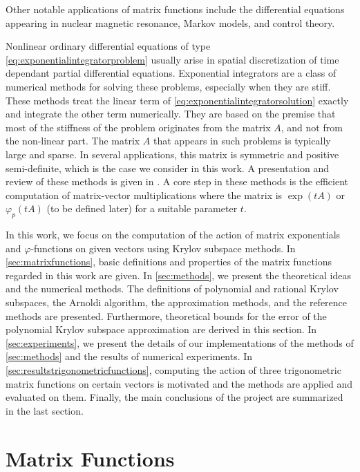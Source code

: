 Other notable applications of matrix functions include the differential equations
appearing in nuclear magnetic resonance, Markov models, and control theory.

Nonlinear ordinary differential equations of type \eqref{eq:exponentialintegratorproblem}
usually arise in spatial discretization of time dependant partial differential equations.
Exponential integrators are a class of numerical methods for solving these problems, especially
when they are stiff. These methods treat the linear term of \eqref{eq:exponentialintegratorsolution}
exactly and integrate the other term numerically. They are based on the premise that most of the
stiffness of the problem originates from the matrix $A$, and not from the non-linear part. The matrix
$A$ that appears in such problems is typically large and sparse. In several applications, this matrix
is symmetric and positive semi-definite, which is the case we consider in this work.
A presentation and review of these methods is given in \cite{minchev2005review}.
A core step in these methods is the efficient computation of matrix-vector multiplications where
the matrix is $\exp(tA)$ or $\varphi_p(tA)$ (to be defined later) for a suitable parameter $t$.

In this work, we focus on the computation of the action of matrix exponentials and
$\varphi$-functions on given vectors using Krylov subspace methods.
In \autoref{sec:matrixfunctions}, basic definitions and properties of the matrix functions
regarded in this work are given. In \autoref{sec:methods}, we present the theoretical ideas
and the numerical methods. The definitions of polynomial and rational Krylov subspaces,
the Arnoldi algorithm, the approximation methods, and the reference methods are presented.
Furthermore, theoretical bounds for the error of the polynomial Krylov subspace approximation
are derived in this section. In \autoref{sec:experiments}, we present the details of our
implementations of the methods of \autoref{sec:methods} and the results of numerical experiments.
In \autoref{sec:resultstrigonometricfunctions}, computing the action of three trigonometric
matrix functions on certain vectors is motivated and the methods are applied and evaluated on them.
Finally, the main conclusions of the project are summarized in the last section.

\section{Matrix Functions}
\label{sec:matrixfunctions}

